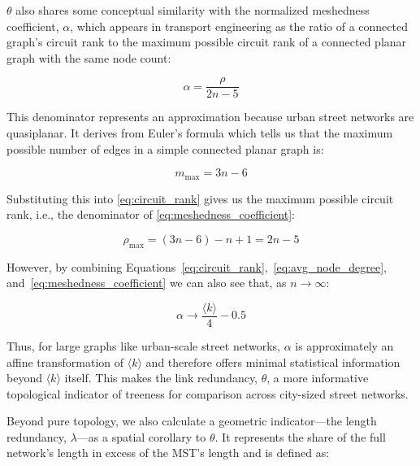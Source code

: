 \documentclass[12pt,letterpaper]{article} %
\begin{document}
$\theta$ also shares some conceptual similarity with the normalized meshedness coefficient, $\alpha$, which appears in transport engineering \citep{levinson_2012_network,cardillo_2006_structural,buhl_2006_topological} as the ratio of a connected graph's circuit rank to the maximum possible circuit rank of a connected planar graph with the same node count:

\begin{equation}
  \label{eq:meshedness_coefficient}
  \alpha = \frac{\rho}{2 n - 5}
\end{equation}

This denominator represents an approximation because urban street networks are quasiplanar. It derives from Euler's formula which tells us that the maximum possible number of edges in a simple connected planar graph is:

\begin{equation}
  \label{eq:max_planar_edges}
  m_{\text{max}} = 3 n - 6
\end{equation}

Substituting this into \autoref{eq:circuit_rank} gives us the maximum possible circuit rank, i.e., the denominator of \autoref{eq:meshedness_coefficient}:

\begin{equation}
  \label{eq:max_planar_circuit_rank}
  \rho_{\text{max}} = (3 n - 6) - n + 1 = 2 n - 5
\end{equation}

However, by combining Equations~\ref{eq:circuit_rank},~\ref{eq:avg_node_degree}, and~\ref{eq:meshedness_coefficient} we can also see that, as $n \to \infty$:

\begin{equation}
  \label{eq:alpha_limit}
  \alpha \to \frac{\langle k \rangle}{4} - 0.5
\end{equation}

Thus, for large graphs like urban-scale street networks, $\alpha$ is approximately an affine transformation of $\langle k \rangle$ and therefore offers minimal statistical information beyond $\langle k \rangle$ itself. This makes the link redundancy, $\theta$, a more informative topological indicator of treeness for comparison across city-sized street networks.

Beyond pure topology, we also calculate a geometric indicator---the length redundancy, $\lambda$---as a spatial corollary to $\theta$. It represents the share of the full network's length in excess of the MST's length and is defined as:
\end{document}

